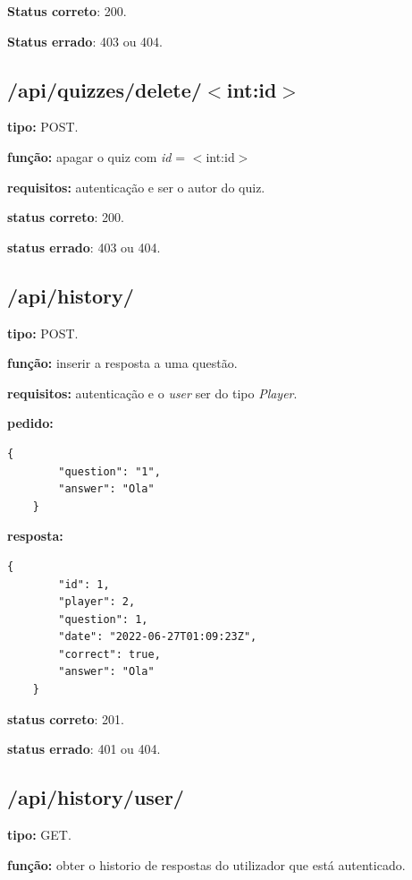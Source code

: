 \documentclass[11pt,a4paper]{report}
\begin{document}
\textbf{Status correto}: 200.

\textbf{Status errado}: 403 ou 404.

\subsection{/api/quizzes/delete/$<$int:id$>$}

\textbf{tipo:} POST.

\textbf{função:} apagar o quiz com \emph{id} = $<$int:id$>$

\textbf{requisitos:} autenticação e ser o autor do quiz.

\textbf{status correto}: 200.

\textbf{status errado}: 403 ou 404.

\newpage

\subsection{/api/history/}

\textbf{tipo:} POST.

\textbf{função:} inserir a resposta a uma questão.

\textbf{requisitos:} autenticação e o \emph{user} ser do tipo \emph{Player}.

\textbf{pedido:}
\begin{lstlisting}[style = code]
    {
        "question": "1",
        "answer": "Ola"
    }
\end{lstlisting}

\textbf{resposta:}

\begin{lstlisting}[style = code]
    {
        "id": 1,
        "player": 2,
        "question": 1,
        "date": "2022-06-27T01:09:23Z",
        "correct": true,
        "answer": "Ola"
    }
\end{lstlisting}

\textbf{status correto}: 201.

\textbf{status errado}: 401 ou 404.

\newpage

\subsection{/api/history/user/}

\textbf{tipo:} GET.

\textbf{função:} obter o historio de respostas do utilizador que está autenticado.
\end{document}
